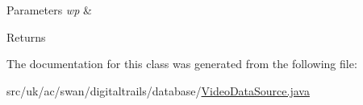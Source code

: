 \begin{DoxyParams}{Parameters}
{\em wp} & \\
\hline
\end{DoxyParams}
\begin{DoxyReturn}{Returns}

\end{DoxyReturn}


The documentation for this class was generated from the following file\+:\begin{DoxyCompactItemize}
\item 
src/uk/ac/swan/digitaltrails/database/\hyperlink{_video_data_source_8java}{Video\+Data\+Source.\+java}\end{DoxyCompactItemize}

